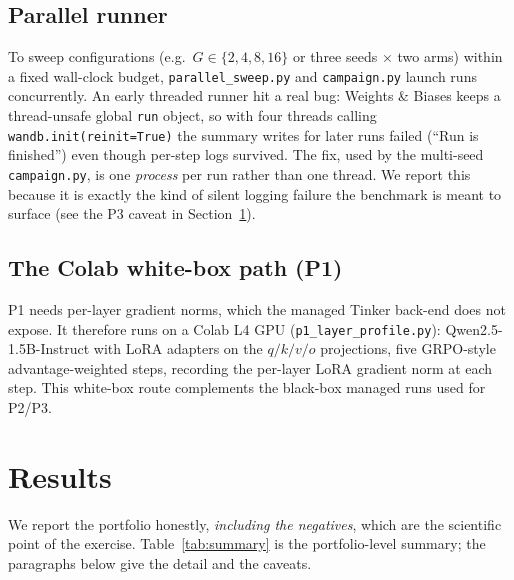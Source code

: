 \documentclass[11pt,a4paper]{article}
\begin{document}
\subsection{Parallel runner}
To sweep configurations (e.g.\ $G \in \{2,4,8,16\}$ or three seeds
$\times$ two arms) within a fixed wall-clock budget, \texttt{parallel\_sweep.py}
and \texttt{campaign.py} launch runs concurrently. An early threaded runner hit
a real bug: Weights \& Biases keeps a thread-unsafe global \texttt{run} object,
so with four threads calling \texttt{wandb.init(reinit=True)} the summary writes
for later runs failed (``Run is finished'') even though per-step logs survived.
The fix, used by the multi-seed \texttt{campaign.py}, is one \emph{process} per
run rather than one thread. We report this because it is exactly the kind of
silent logging failure the benchmark is meant to surface (see the P3 caveat in
Section~\ref{sec:results}).

\subsection{The Colab white-box path (P1)}
P1 needs per-layer gradient norms, which the managed Tinker back-end does not
expose. It therefore runs on a Colab L4 GPU
(\texttt{p1\_layer\_profile.py}): Qwen2.5-1.5B-Instruct with LoRA adapters on the
$q/k/v/o$ projections, five GRPO-style advantage-weighted steps, recording the
per-layer LoRA gradient norm at each step. This white-box route complements the
black-box managed runs used for P2/P3.

\section{Results}
\label{sec:results}

We report the portfolio honestly, \emph{including the negatives}, which are the
scientific point of the exercise. Table~\ref{tab:summary} is the portfolio-level
summary; the paragraphs below give the detail and the caveats.
\end{document}
